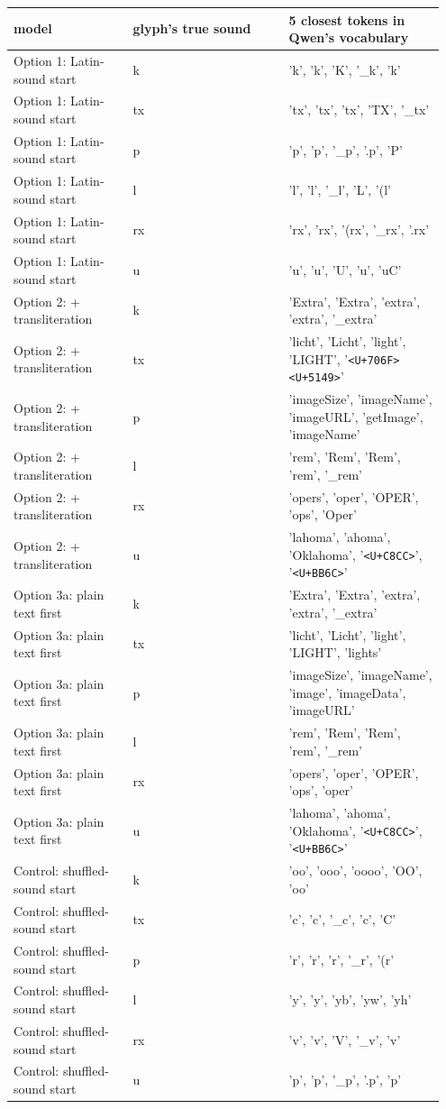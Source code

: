 \documentclass[10pt,a4paper,oneside]{article}
\begin{document}
{\footnotesize
\begin{longtable}{>{\raggedright\arraybackslash}p{0.260\linewidth}>{\raggedright\arraybackslash}p{0.343\linewidth}>{\raggedright\arraybackslash}p{0.343\linewidth}}
\toprule
\textbf{model} & \textbf{glyph's true sound} & \textbf{5 closest tokens in Qwen's vocabulary} \\
\midrule
\endhead
Option 1: Latin-sound start & k & 'k', 'k', 'K', '\_k', 'k' \\
Option 1: Latin-sound start & tx & 'tx', 'tx', 'tx', 'TX', '\_tx' \\
Option 1: Latin-sound start & p & 'p', 'p', '\_p', '.p', 'P' \\
Option 1: Latin-sound start & l & 'l', 'l', '\_l', 'L', '(l' \\
Option 1: Latin-sound start & rx & 'rx', 'rx', '(rx', '\_rx', '.rx' \\
Option 1: Latin-sound start & u & 'u', 'u', 'U', 'u', 'uC' \\
Option 2: + transliteration & k & 'Extra', 'Extra', 'extra', 'extra', '\_extra' \\
Option 2: + transliteration & tx & 'licht', 'Licht', 'light', 'LIGHT', '\texttt{<U+706F>}\texttt{<U+5149>}' \\
Option 2: + transliteration & p & 'imageSize', 'imageName', 'imageURL', 'getImage', 'imageName' \\
Option 2: + transliteration & l & 'rem', 'Rem', 'Rem', 'rem', '\_rem' \\
Option 2: + transliteration & rx & 'opers', 'oper', 'OPER', 'ops', 'Oper' \\
Option 2: + transliteration & u & 'lahoma', 'ahoma', 'Oklahoma', '\texttt{<U+C8CC>}', '\texttt{<U+BB6C>}' \\
Option 3a: plain text first & k & 'Extra', 'Extra', 'extra', 'extra', '\_extra' \\
Option 3a: plain text first & tx & 'licht', 'Licht', 'light', 'LIGHT', 'lights' \\
Option 3a: plain text first & p & 'imageSize', 'imageName', 'image', 'imageData', 'imageURL' \\
Option 3a: plain text first & l & 'rem', 'Rem', 'Rem', 'rem', '\_rem' \\
Option 3a: plain text first & rx & 'opers', 'oper', 'OPER', 'ops', 'oper' \\
Option 3a: plain text first & u & 'lahoma', 'ahoma', 'Oklahoma', '\texttt{<U+C8CC>}', '\texttt{<U+BB6C>}' \\
Control: shuffled-sound start & k & 'oo', 'ooo', 'oooo', 'OO', 'oo' \\
Control: shuffled-sound start & tx & 'c', 'c', '\_c', 'c', 'C' \\
Control: shuffled-sound start & p & 'r', 'r', 'r', '\_r', '(r' \\
Control: shuffled-sound start & l & 'y', 'y', 'yb', 'yw', 'yh' \\
Control: shuffled-sound start & rx & 'v', 'v', 'V', '\_v', 'v' \\
Control: shuffled-sound start & u & 'p', 'p', '\_p', '.p', 'p' \\
\bottomrule
\end{longtable}}
\end{document}
